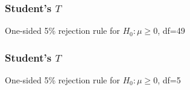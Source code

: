 \documentclass[handout]{beamer}
\begin{document}
   \begin{frame}
   \frametitle{Student's $T$}
   \begin{center}
   \end{center}
   One-sided {\color{blue} 5\% rejection rule} for $H_0:\mu \geq 0$, df=49
   \end{frame}



   \begin{frame}
   \frametitle{Student's $T$}
   \begin{center}
   \end{center}
   One-sided {\color{blue} 5\% rejection rule} for $H_0:\mu \geq 0$, df=5
   \end{frame}

\end{document}
